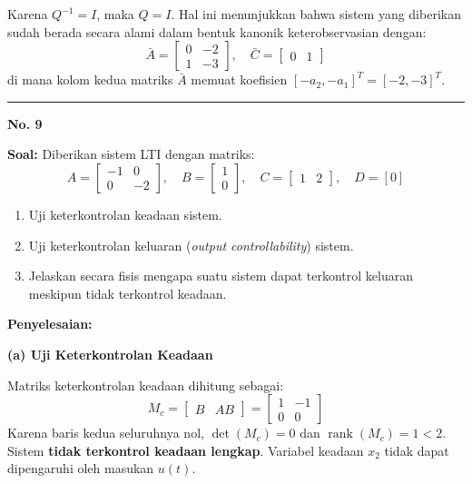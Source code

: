\documentclass[11pt,a4paper]{article}
\begin{document}
Karena $Q^{-1} = I$, maka $Q = I$. Hal ini menunjukkan bahwa sistem yang diberikan sudah berada secara alami dalam bentuk kanonik keterobservasian dengan:
$$\bar{A} = \begin{bmatrix} 0 & -2 \\ 1 & -3 \end{bmatrix}, \quad \bar{C} = \begin{bmatrix} 0 & 1 \end{bmatrix}$$
di mana kolom kedua matriks $\bar{A}$ memuat koefisien $[-a_2, -a_1]^T = [-2, -3]^T$.

\vspace{12pt}
\hrule
\vspace{10pt}

\textbf{\large No. 9}

\textbf{Soal:}  
Diberikan sistem LTI dengan matriks:
$$A = \begin{bmatrix} -1 & 0 \\ 0 & -2 \end{bmatrix}, \quad B = \begin{bmatrix} 1 \\ 0 \end{bmatrix}, \quad C = \begin{bmatrix} 1 & 2 \end{bmatrix}, \quad D = [0]$$
\begin{enumerate}[label=(\alph*)]
    \item Uji keterkontrolan keadaan sistem.
    \item Uji keterkontrolan keluaran (\textit{output controllability}) sistem.
    \item Jelaskan secara fisis mengapa suatu sistem dapat terkontrol keluaran meskipun tidak terkontrol keadaan.
\end{enumerate}

\textbf{Penyelesaian:}

\textbf{(a) Uji Keterkontrolan Keadaan}

Matriks keterkontrolan keadaan dihitung sebagai:
$$M_c = \begin{bmatrix} B & AB \end{bmatrix} = \begin{bmatrix} 1 & -1 \\ 0 & 0 \end{bmatrix}$$
Karena baris kedua seluruhnya nol, $\det(M_c) = 0$ dan $\operatorname{rank}(M_c) = 1 < 2$. Sistem \textbf{tidak terkontrol keadaan lengkap}. Variabel keadaan $x_2$ tidak dapat dipengaruhi oleh masukan $u(t)$.
\end{document}
